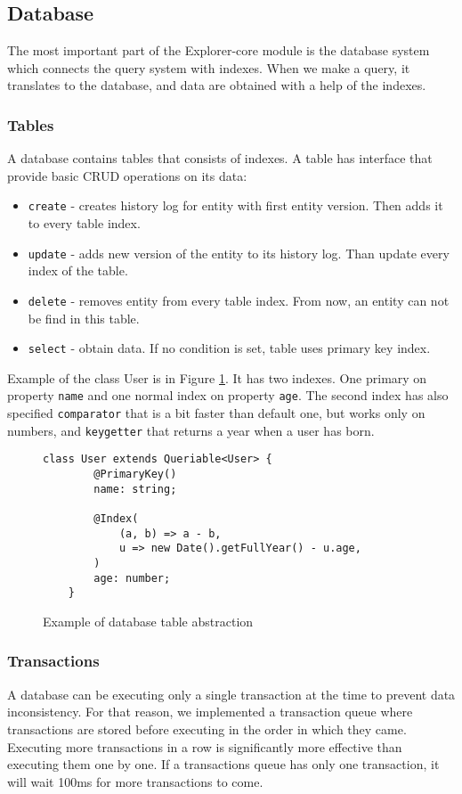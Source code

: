 \subsection{Database}
The most important part of the Explorer-core module is the database system which connects the query system with indexes. When we make a query, it translates to the database, and data are obtained with a help of the indexes.

\subsubsection{Tables}
A database contains tables that consists of indexes. A table has interface that provide basic CRUD operations on its data:
\begin{itemize}
    \item \texttt{create} - creates history log for entity with first entity version. Then adds it to every table index.
    \item \texttt{update} - adds new version of the entity to its history log. Than update every index of the table.
    \item \texttt{delete} - removes entity from every table index. From now, an entity can not be find in this table.
    \item \texttt{select} - obtain data. If no condition is set, table uses primary key index.
\end{itemize}

Example of the class User is in Figure \ref{classExample}. It has two indexes. One primary on property \texttt{name} and one normal index on property \texttt{age}. The second index has also specified \texttt{comparator} that is a bit faster than default one, but works only on numbers, and \texttt{keygetter} that returns a year when a user has born. 

\begin{figure}[h]
    \centering
    \begin{lstlisting}[style=ES6]
    class User extends Queriable<User> {
        @PrimaryKey()
        name: string;

        @Index(
            (a, b) => a - b,
            u => new Date().getFullYear() - u.age,
        )
        age: number;
    }
    \end{lstlisting}
    \caption{Example of database table abstraction }
    \label{classExample}
\end{figure}



\subsubsection{Transactions}
A database can be executing only a single transaction at the time to prevent data inconsistency. For that reason, we implemented a transaction queue where transactions are stored before executing in the order in which they came. Executing more transactions in a row is significantly more effective than executing them one by one. If a transactions queue has only one transaction, it will wait 100ms for more transactions to come.  

